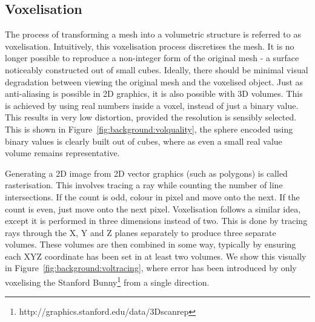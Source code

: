 \subsection{Voxelisation}

The process of transforming a mesh into a volumetric structure is
referred to as voxelisation. Intuitively, this voxelisation process
discretises the mesh. It is no longer possible to reproduce a
non-integer form of the original mesh - a surface noticeably
constructed out of small cubes. Ideally, there should be minimal
visual degradation between viewing the original mesh and the voxelised
object.  Just as anti-aliasing is possible in 2D graphics, it is also
possible with 3D volumes. This is achieved by using real numbers
inside a voxel, instead of just a binary value.  This results in very
low distortion, provided the resolution is sensibly selected. This is
shown in Figure~\ref{fig:background:volquality}, the sphere encoded
using binary values is clearly built out of cubes, where as even a
small real value volume remains representative.

Generating a 2D image from 2D vector graphics (such as polygons) is
called rasterisation. This involves tracing a ray while counting the
number of line intersections. If the count is odd, colour in pixel and
move onto the next. If the count is even, just move onto the next
pixel. Voxelisation follows a similar idea, except it is performed in
three dimensions instead of two. This is done by tracing rays through
the X, Y and Z planes separately to produce three separate
volumes. These volumes are then combined in some way, typically by
ensuring each XYZ coordinate has been set in at least two volumes. We
show this visually in Figure~\ref{fig:background:voltracing}, where
error has been introduced by only voxelising the Stanford
Bunny\footnote{http://graphics.stanford.edu/data/3Dscanrep} from a
single direction.

